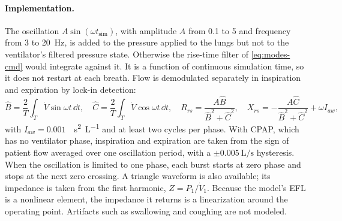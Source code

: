 \paragraph{Implementation.} The oscillation $A\sin(\omega t_{\mathrm{sim}})$, with amplitude $A$ from 0.1 to \SI{5}{\cmH} and frequency from 3 to \SI{20}{\hertz}, is added to the pressure applied to the lungs but not to the ventilator's filtered pressure state. Otherwise the rise-time filter of \cref{eq:modes-cmd} would integrate against it. It is a function of continuous simulation time, so it does not restart at each breath. Flow is demodulated separately in inspiration and expiration by lock-in detection:
\begin{equation}
\hat B=\frac{2}{T}\int_T\dot V\sin\omega t\,\dd t,\quad
\hat C=\frac{2}{T}\int_T\dot V\cos\omega t\,\dd t,\quad
R_{rs}=\frac{A\hat B}{\hat B^2+\hat C^2},\quad
X_{rs}=-\frac{A\hat C}{\hat B^2+\hat C^2}+\omega I_{aw},
\label{eq:mech-lockin}
\end{equation}
with $I_{aw}=0.001$~\si{\cmH\second\squared\per\liter} and at least two cycles per phase. With CPAP, which has no ventilator phase, inspiration and expiration are taken from the sign of patient flow averaged over one oscillation period, with a $\pm\SI{0.005}{\liter\per\second}$ hysteresis. When the oscillation is limited to one phase, each burst starts at zero phase and stops at the next zero crossing. A triangle waveform is also available; its impedance is taken from the first harmonic, $Z=P_1/\dot V_1$. Because the model's EFL is a nonlinear element, the impedance it returns is a linearization around the operating point. Artifacts such as swallowing and coughing are not modeled.

